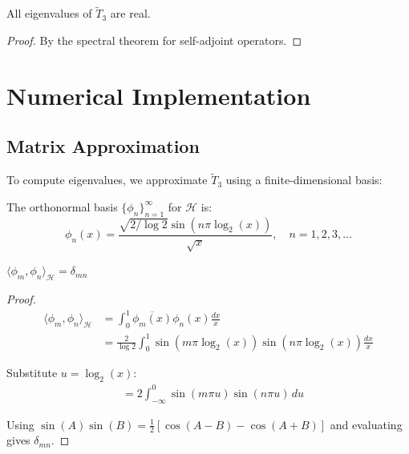 \begin{corollary}\label{cor:real-eigenvalues}
All eigenvalues of $\tilde{T}_3$ are real.
\end{corollary}

\begin{proof}
By the spectral theorem for self-adjoint operators\cite{reed1980,rudin1976}.
\end{proof}

\section{Numerical Implementation}

\subsection{Matrix Approximation}

To compute eigenvalues, we approximate $\tilde{T}_3$ using a finite-dimensional basis:

\begin{defn}\label{def:computational-basis}
The orthonormal basis $\{\phi_n\}_{n=1}^{\infty}$ for $\mathcal{H}$ is:
\begin{equation}
\phi_n(x) = \frac{\sqrt{2/\log 2} \sin(n\pi\log_2(x))}{\sqrt{x}}, \quad n = 1, 2, 3, \ldots
\end{equation}
\end{defn}

\begin{proposition}[Orthonormality]\label{prop:basis-orthonormal}
$\langle \phi_m, \phi_n \rangle_{\mathcal{H}} = \delta_{mn}$
\end{proposition}

\begin{proof}
\begin{align}
\langle \phi_m, \phi_n \rangle_{\mathcal{H}} &= \int_0^1 \overline{\phi_m(x)} \phi_n(x) \frac{dx}{x}\\
&= \frac{2}{\log 2} \int_0^1 \sin(m\pi\log_2(x)) \sin(n\pi\log_2(x)) \frac{dx}{x}
\end{align}

Substitute $u = \log_2(x)$:
\begin{align}
&= 2 \int_{-\infty}^0 \sin(m\pi u) \sin(n\pi u) \, du
\end{align}

Using $\sin(A)\sin(B) = \frac{1}{2}[\cos(A-B) - \cos(A+B)]$ and evaluating gives $\delta_{mn}$.
\end{proof}


